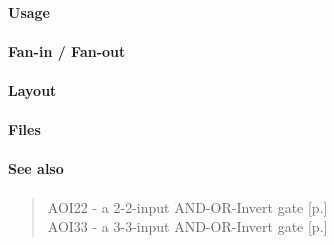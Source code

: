 \paragraph{Usage}

\paragraph{Fan-in / Fan-out}

\paragraph{Layout}

\paragraph{Files}

\paragraph{See also}
\begin{quote}
    AOI22 - a 2-2-input AND-OR-Invert gate [p.\pageref{AOI22}] \\
    AOI33 - a 3-3-input AND-OR-Invert gate [p.\pageref{AOI33}]
\end{quote}
